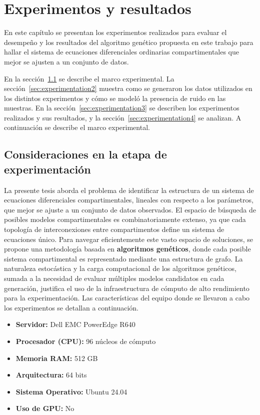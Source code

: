 \chapter{Experimentos y resultados}\label{chapter:Results}

En este capítulo se presentan los experimentos realizados para evaluar
el desempeño y los resultados del algoritmo gen\'etico propuesta en este
trabajo para hallar el sistema de ecuaciones diferenciales ordinarias compartimentales que mejor se ajusten a un conjunto de datos.

En la sección~\ref{sec:experimentation1} se describe el marco experimental. La secci\'on~\ref{sec:experimentation2} muestra como se generaron los datos utilizados en los distintos experimentos y cómo se modeló la presencia de ruido en las muestras. En la sección~\ref{sec:experimentation3} se describen los experimentos realizados y sus resultados, y la secci\'on~\ref{sec:experimentation4} se analizan. A continuación se describe el marco experimental.


\section{Consideraciones en la etapa de experimentaci\'on}
\label{sec:experimentation1}
La presente tesis aborda el problema de identificar la estructura de un sistema de ecuaciones diferenciales compartimentales, lineales con respecto a los parámetros, que mejor se ajuste a un conjunto de datos observados. El espacio de búsqueda de posibles modelos compartimentales es combinatoriamente extenso, ya que cada topología de interconexiones entre compartimentos define un sistema de ecuaciones único. Para navegar eficientemente este vasto espacio de soluciones, se propone una metodología basada en \textbf{algoritmos genéticos}, donde cada posible sistema compartimental es representado mediante una estructura de grafo. La naturaleza estocástica y la carga computacional de los algoritmos genéticos, sumada a la necesidad de evaluar múltiples modelos candidatos en cada generación, justifica el uso de la infraestructura de cómputo de alto rendimiento para la experimentación. Las características del equipo donde se llevaron a cabo los experimentos se detallan a continuación.

\begin{itemize}
    \item \textbf{Servidor:} Dell EMC PowerEdge R640
    \item \textbf{Procesador (CPU):} 96 núcleos de cómputo
    \item \textbf{Memoria RAM:} 512 GB
    \item \textbf{Arquitectura:} 64 bits
    \item \textbf{Sistema Operativo:} Ubuntu 24.04
    \item \textbf{Uso de GPU:} No
\end{itemize}

